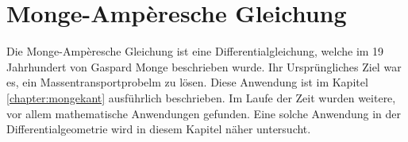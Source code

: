 %
%
%
%
\chapter{Monge-Ampèresche Gleichung\label{chapter:mongeampere}}
\begin{refsection}

Die Monge-Ampèresche Gleichung ist eine Differentialgleichung, welche
im 19 Jahrhundert von Gaspard Monge beschrieben wurde. 
Ihr Ursprüngliches Ziel war es, ein Massentransportprobelm zu lösen. 
Diese Anwendung ist im Kapitel \ref{chapter:mongekant} ausführlich beschrieben.
Im Laufe der Zeit wurden weitere, vor allem mathematische Anwendungen
gefunden.
Eine solche Anwendung in der Differentialgeometrie wird in diesem Kapitel näher 
untersucht.

%
%
%
% 

\printbibliography[heading=subbibliography]
\end{refsection}
